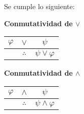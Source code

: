 \documentclass[12pt]{report}
\theoremstyle{largebreak}
\begin{document}
    \begin{propo}
        Se cumple lo siguiente:
        \begin{center}
            \textbf{Conmutatividad de $\lor$}
        \end{center}
        \begin{center}
            \begin{tabular}{c c c}
                $\varphi$ & $\lor$ & $\psi$ \\
                \hline
                 & $\therefore$ & $\psi\lor\varphi$ \\
            \end{tabular}
        \end{center}
        \begin{center}
            \textbf{Conmutatividad de $\land$}
        \end{center}
        \begin{center}
            \begin{tabular}{c c c}
                $\varphi$ & $\land$ & $\psi$ \\
                \hline
                 & $\therefore$ & $\psi\land\varphi$ \\
            \end{tabular}
        \end{center}
    \end{propo}
\end{document}
